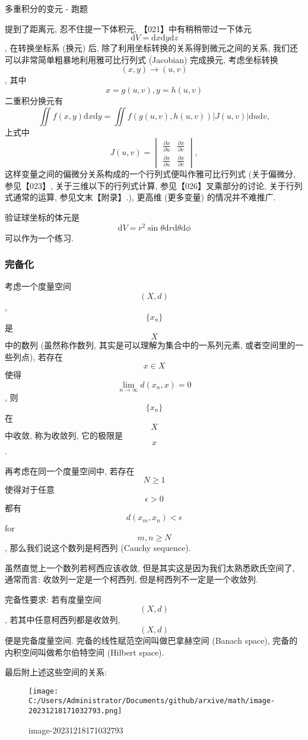 \begin{newquote}
\begin{newquote}
多重积分的变元 - 跑题

提到了距离元, 忍不住提一下体积元, 【021】中有稍稍带过一下体元
\[\mathrm{d}V=\mathrm{d}x\mathrm{d}y\mathrm{d}z\], 在转换坐标系 (换元)
后, 除了利用坐标转换的关系得到微元之间的关系,
我们还可以非常简单粗暴地利用雅可比行列式 (Jacobian) 完成换元,
考虑坐标转换 \[(x,y)\rightarrow(u,v)\], 其中 \[x=g(u,v), y=h(u,v)\]
二重积分换元有 \[
\iint f(x,y)\mathrm{d}x\mathrm{d}y=\iint f(g(u,v),h(u,v))|J(u,v)|\mathrm{d}u\mathrm{d}v,
\] 上式中 \[
J(u,v)=\begin{vmatrix}\frac{\partial x}{\partial u}&\frac{\partial x}{\partial v}\\\frac{\partial x}{\partial u}&\frac{\partial x}{\partial v}\end{vmatrix},
\] 这样变量之间的偏微分关系构成的一个行列式便叫作雅可比行列式
(关于偏微分, 参见【023】, 关于三维以下的行列式计算,
参见【026】叉乘部分的讨论, 关于行列式通常的运算, 参见文末【附录】.),
更高维 (更多变量) 的情况并不难推广.

验证球坐标的体元是
\[\mathrm{d}V=r^2\sin\theta\mathrm{d}r\mathrm{d}\theta\mathrm{d}\phi\]
可以作为一个练习.
\end{newquote}
\end{newquote}

\subsubsection{完备化}

考虑一个度量空间 \[(X,d)\], \[\{x_n\}\] 是 \[X\] 中的数列 (虽然称作数列,
其实是可以理解为集合中的一系列元素, 或者空间里的一些列点), 若存在
\[x\in X\] 使得 \[\lim_{n\rightarrow\infty}d(x_n,x)=0\], 则 \[\{x_n\}\]
在 \[X\] 中收敛, 称为收敛列, 它的极限是 \[x\].

再考虑在同一个度量空间中, 若存在 \[N\ge1\] 使得对于任意 \[\epsilon>0\]
都有 \[d(x_m,x_n)<\epsilon\] for \[m,n\ge N\],
那么我们说这个数列是柯西列 (Cauchy sequence).

虽然直觉上一个数列若柯西应该收敛, 但是其实这是因为我们太熟悉欧氏空间了,
通常而言: 收敛列一定是一个柯西列, 但是柯西列不一定是一个收敛列.

完备性要求: 若有度量空间 \[(X,d)\], 若其中任意柯西列都是收敛列,
\[(X,d)\] 便是完备度量空间. 完备的线性赋范空间叫做巴拿赫空间 (Banach
space), 完备的内积空间叫做希尔伯特空间 (Hilbert space).

最后附上述这些空间的关系:

\begin{figure}
\centering
\texttt{[image: C:/Users/Administrator/Documents/github/arxive/math/image-20231218171032793.png]}
\caption{image-20231218171032793}
\end{figure}

